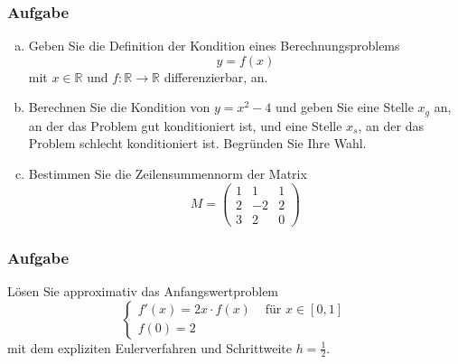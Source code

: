\documentclass[a4paper,11pt]{scrartcl}
\newcounter{auf}
\newcommand{\Aufgabe}%
        {\addtocounter{auf}{1} \subsubsection*{\rmfamily  Aufgabe \theauf \hspace{1em}} }
\newcommand{\RR}{\mathbb{R}}
\begin{document}
\Aufgabe

\begin{enumerate}[a)]

\item Geben Sie die Definition der Kondition eines Berechnungsproblems 
$$
	y=f(x)
$$
mit $x \in \RR$ und $f:\RR \to \RR$ differenzierbar, an.
\item  Berechnen Sie die Kondition von $y=x^2-4$ und geben Sie eine Stelle $x_g$ an, an der das Problem gut konditioniert ist, und eine Stelle $x_s$, an der das Problem schlecht konditioniert ist. Begründen Sie Ihre Wahl.
\item Bestimmen Sie die Zeilensummennorm der Matrix
$$
M=\begin{pmatrix} 1&1&1 \\ 2&-2&2\\ 3 & 2&0 \end{pmatrix}
$$
\end{enumerate}
%
%
\newpage
\Aufgabe
Lösen Sie approximativ das Anfangswertproblem
$$
\begin{cases} f'(x)=2x\cdot f(x) & \text{ für } x \in [0,1] \\
f(0)=2
\end{cases}
$$
mit dem expliziten Eulerverfahren und Schrittweite $h=\frac{1}{2}$.
\end{document}
